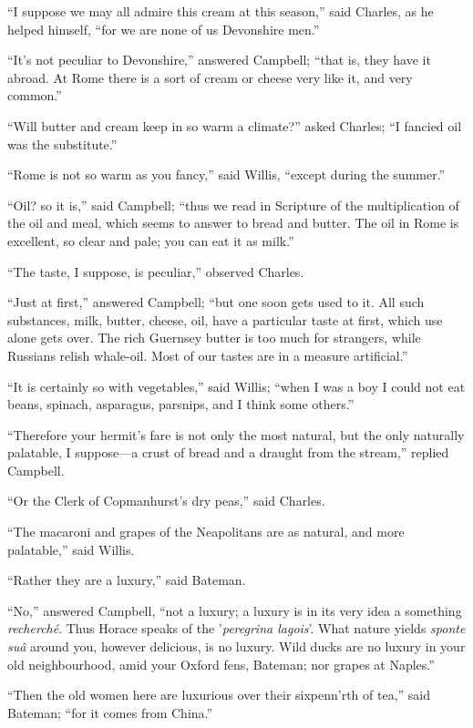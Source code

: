 ``I suppose we may all admire this cream at this season,'' said Charles, as he helped himself, ``for we are
none of us Devonshire men.''

``It's not peculiar to Devonshire,'' answered Campbell;
``that is, they have it abroad. At Rome there is a sort of cream
or cheese very like it, and very common.''

``Will butter and cream keep in so warm a climate?'' asked
Charles; ``I fancied oil was the substitute.''

``Rome is not so warm as you fancy,'' said Willis,
``except during the summer.''

``Oil? so it is,'' said Campbell; ``thus we read in
Scripture of the multiplication of the oil and meal, which seems to
answer to bread and butter. The oil in Rome is excellent, so clear and
pale; you can eat it as milk.''

``The taste, I suppose, is peculiar,'' observed Charles.

``Just at first,'' answered Campbell; ``but one soon
gets used to it. All such substances, milk, butter, cheese, oil, have
a particular taste at first, which use alone gets over. The rich
Guernsey butter is too much for strangers, while Russians relish
whale-oil. Most of our tastes are in a measure artificial.''

``It is certainly so with vegetables,'' said Willis;
``when I was a boy I could not eat beans, spinach, asparagus,
parsnips, and I think some others.''

``Therefore your hermit's fare is not only the most natural,
but the only naturally palatable, I suppose—a crust of bread and a
draught from the stream,'' replied Campbell.

``Or the Clerk of Copmanhurst's dry peas,'' said Charles.

``The macaroni and grapes of the Neapolitans are as natural,
and more palatable,'' said Willis.

``Rather they are a luxury,'' said Bateman.

``No,'' answered Campbell, ``not a luxury; a luxury is
in its very idea a something \emph{recherché}. Thus Horace speaks of
the '\emph{peregrina lagois}'. What nature yields \emph{sponte suâ}
around you, however delicious, is no luxury. Wild ducks are no luxury
in your old neighbourhood, amid your Oxford fens, Bateman; nor grapes
at Naples.''

``Then the old women here are luxurious over their sixpenn'rth
of tea,'' said Bateman; ``for it comes from China.''

